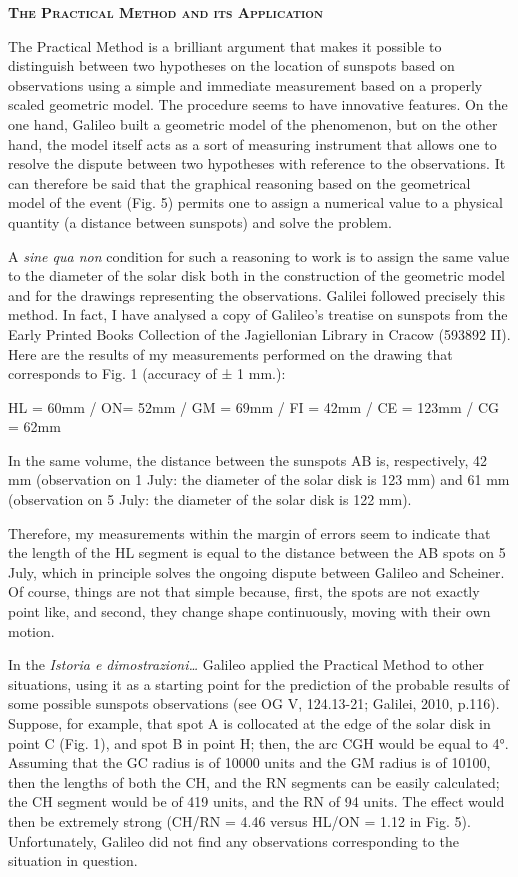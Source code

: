 \documentclass[a4paper]{article}
\begin{document}
{\centering\bfseries\scshape
The Practical Method and its Application
\par}

The Practical Method is a brilliant argument that makes it possible to distinguish between two hypotheses on the
location of sunspots based on observations using a simple and immediate measurement based on a properly scaled
geometric model. The procedure seems to have innovative features. On the one hand, Galileo built a geometric model of
the phenomenon, but on the other hand, the model itself acts as a sort of measuring instrument that allows one to
resolve the dispute between two hypotheses with reference to the observations. It can therefore be said that the
graphical reasoning based on the geometrical model of the event (Fig. 5) permits one to assign a numerical value to a
physical quantity (a distance between sunspots) and solve the problem.

A \textit{sine qua non} condition for such a reasoning to work is to assign the same value to the diameter of the solar
disk both in the construction of the geometric model and for the drawings representing the observations. Galilei
followed precisely this method. In fact, I have analysed a copy of Galileo’s treatise on sunspots from the Early
Printed Books Collection of the Jagiellonian Library in Cracow (593892 II). Here are the results of my measurements
performed on the drawing that corresponds to Fig. 1 (accuracy of ± 1 mm.):

{\centering
HL = 60mm / ON= 52mm / GM = 69mm / FI = 42mm / CE = 123mm / CG = 62mm
\par}

In the same volume, the distance between the sunspots AB is, respectively, 42 mm (observation on 1 July: the diameter of
the solar disk is 123 mm) and 61 mm (observation on 5 July: the diameter of the solar disk is 122 mm).

Therefore, my measurements within the margin of errors seem to indicate that the length of the HL segment is equal to
the distance between the AB spots on 5 July, which in principle solves the ongoing dispute between Galileo and
Scheiner. Of course, things are not that simple because, first, the spots are not exactly point like, and second, they
change shape continuously, moving with their own motion.

In the \textit{Istoria e dimostrazioni…} Galileo applied the Practical Method to other situations, using it as a
starting point for the prediction of the probable results of some possible sunspots observations
\label{ref:RNDXFf9yDVuZC}(see OG V, 124.13-21; Galilei, 2010, p.116). Suppose, for example, that spot A is collocated
at the edge of the solar disk in point C (Fig. 1), and spot B in point H; then, the arc CGH would be equal to 4°.
Assuming that the GC radius is of 10000 units and the GM radius is of 10100, then the lengths of both the CH, and the
RN segments can be easily calculated; the CH segment would be of 419 units, and the RN of 94 units. The effect would
then be extremely strong (CH/RN = 4.46 versus HL/ON = 1.12 in Fig. 5). Unfortunately, Galileo did not find any
observations corresponding to the situation in question.
\end{document}
